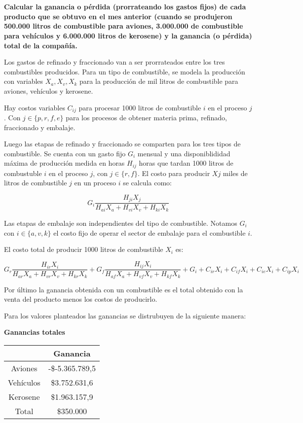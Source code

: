 \documentclass[10pt,a4paper]{article}
\begin{document}
\section{}
\textbf{Calcular la ganancia o pérdida (prorrateando los gastos fijos) de cada producto que se obtuvo en el mes
anterior (cuando se produjeron 500.000 litros de combustible para aviones, 3.000.000 de combustible para
vehículos y 6.000.000 litros de kerosene) y la ganancia (o pérdida) total de la compañía.}

\vspace{5mm}

Los gastos de refinado y fraccionado van a ser prorrateados entre los tres combustibles producidos. Para un tipo de combustible, se modela la producción con variables $X_a, X_v, X_k$ para la producción de mil litros de combustible para aviones, vehículos y kerosene.

Hay costos variables $C_{ij}$ para procesar 1000 litros de combustible $i$ en el proceso $j$ . Con $j \in \{p, r, f, e\}$ para los procesos de obtener materia prima, refinado, fraccionado y embalaje.

Luego las etapas de refinado y fraccionado se comparten para los tres tipos de combustible. Se cuenta con un gasto fijo $G_i$ mensual y una disponiblididad máxima de producción medida en horas $H_{ij}$ horas que tardan 1000 litros de combustuble $i$ en el proceso $j$, con $j \in \{r, f\}$. El costo para producir $Xj$ miles de litros de combustible $j$ en un proceso $i$ se calcula como:

$$
G_i \frac{H_{ji} X_j}{H_{ai} X_a + H_{vi} X_v + H_{ki} X_k}
$$

Las etapas de embalaje son independientes del tipo de combustible. Notamos $G_i$ con $i \in \{a,v,k\}$ el costo fijo de operar el sector de embalaje para el combustible $i$.

El costo total de producir 1000 litros de combustible $X_i$ es:

$$
G_r \frac{H_{ir} X_i}{H_{ar} X_a + H_{vr} X_v + H_{kr} X_k} + G_f \frac{H_{ij} X_i}{H_{af} X_a + H_{vf} X_v + H_{kf} X_k} + G_i + C_{ir} X_i + C_{if} X_i + C_{ie} X_i + C_{ip} X_i
$$

Por último la ganancia obtenida con un combustible es el total obtenido con la venta del producto menos los costos de producirlo.

Para los valores planteados las ganancias se distrubuyen de la siguiente manera:

\begin{center}
	\textbf{Ganancias totales}

	\begin{tabular}{| c | c |}
		\hline
		&           Ganancia    \\
		\hline
		Aviones   & -\$-5.365.789,5  \\
		\hline
		Vehículos & \$3.752.631,6 \\
		\hline
		Kerosene  & \$1.963.157,9 \\
		\hline
		Total     & \$350.000\\
		\hline
	\end{tabular}
\end{center}
\end{document}
